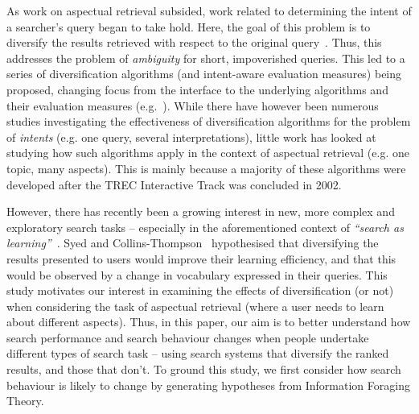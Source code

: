 As work on aspectual retrieval subsided, work related to determining the intent of a searcher's query began to take hold. Here, the goal of this problem is to diversify the results retrieved with respect to the original query~\cite{rose2004understanding_user_goals}. Thus, this addresses the problem of \emph{ambiguity} for short, impoverished queries. This led to a series of diversification algorithms (and intent-aware evaluation measures) being proposed, changing focus from the interface to the underlying algorithms and their evaluation measures (e.g.~\cite{agrawal2009diversification,carbonell1998mmr,carterette2009probabalistic,chen2006lessismore,he2011diversification_clustering,radlinski2006diversification,santos2010query_reformulations_diversification,santos2011intent,zhai2015subtopics,zuccon2009qprp}). While there have however been numerous studies investigating the effectiveness of diversification algorithms for the problem of \emph{intents} (e.g. one query, several interpretations), little work has looked at studying how such algorithms apply in the context of aspectual retrieval (e.g. one topic, many aspects). This is mainly because a majority of these algorithms were developed after the TREC Interactive Track was concluded in 2002.

However, there has recently been a growing interest in new, more complex and exploratory search tasks -- especially in the aforementioned context of \emph{``search as learning''}~\cite{collins2017sal}. Syed and Collins-Thompson~\cite{syed2017sal} hypothesised that diversifying the results presented to users would improve their learning efficiency, and that this would be observed by a change in vocabulary expressed in their queries. This study motivates our interest in examining the effects of diversification (or not) when considering the task of aspectual retrieval (where a user needs to learn about different aspects). Thus, in this paper, our aim is to better understand how search performance and search behaviour changes when people undertake different types of search task -- using search systems that diversify the ranked results, and those that don't. To ground this study, we first consider how search behaviour is likely to change by generating hypotheses from Information Foraging Theory.


